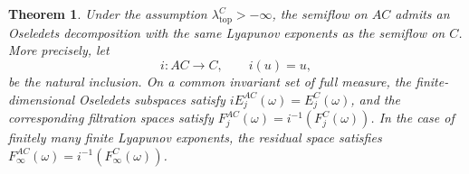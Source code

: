 \documentclass[reqno]{amsart}
\theoremstyle{plain}
\newtheorem{theorem}{Theorem}[section]
\numberwithin{equation}{section}
\numberwithin{definition}{section}
\begin{document}
\begin{theorem}
Under the assumption $\lambda_{\mathrm{top}}^C>-\infty$,
the semiflow on $AC$ admits an Oseledets decomposition
with the same Lyapunov exponents
as the semiflow on $C$. More precisely, let
\begin{equation*}
    i:AC\to C,
    \qquad i(u)=u,
\end{equation*}
be the natural inclusion.
On a common invariant set of full measure, the
finite-dimensional Oseledets subspaces satisfy $iE_j^{AC}(\omega)=E_j^C(\omega)$,
and the corresponding filtration spaces satisfy $F_j^{AC}(\omega)=i^{-1}(F_j^C(\omega))$. 
In the case of finitely many finite Lyapunov exponents,
the residual space satisfies $ F_\infty^{AC}(\omega)=i^{-1}(F_\infty^C(\omega))$. 
\end{theorem}
\end{document}
